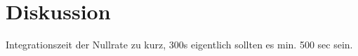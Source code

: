 \newpage
\section{Diskussion}
Integrationszeit der Nullrate zu kurz, 300s eigentlich sollten es min. 500 sec sein.

